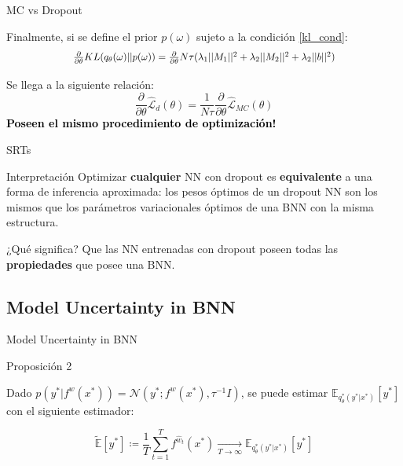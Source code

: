 \begin{frame}{MC vs Dropout}

Finalmente, si se define el prior $p(\omega)$ sujeto a la condición \ref{kl_cond}:
\begin{equation}\label{kl_cond}
    \scalebox{0.9}{$\frac{\partial}{\partial \theta} KL(q_{\theta}(\omega) || p(\omega)) = \frac{\partial}{\partial \theta} N\tau (\lambda_1||M_1||^2 + \lambda_2||M_2||^2 + \lambda_2||b||^2)$}
\end{equation}

Se llega a la siguiente relación:
\begin{equation}\label{mc-drop}
\frac{\partial}{\partial \theta}\hat{\mathcal{L}}_{d}(\theta) = \frac{1}{N\tau}\frac{\partial}{\partial \theta} \hat{\mathcal{L}}_{MC}(\theta)
\end{equation}
\textbf{\textcolor{black}{Poseen el mismo procedimiento de optimización!}}
\end{frame}
\begin{frame}{SRTs}
     \begin{block}{Interpretación}
        Optimizar \textbf{cualquier} NN con dropout es \textbf{equivalente} a una forma de inferencia aproximada: los pesos óptimos de un dropout NN son los mismos que los parámetros variacionales óptimos de una BNN con la misma estructura.
    \end{block}
    
    \begin{alertblock}{¿Qué significa?}
    Que las NN entrenadas con dropout poseen todas las \textbf{propiedades} que posee una BNN.
    \end{alertblock}
\end{frame}

\subsection{Model Uncertainty in BNN}

\begin{frame}{Model Uncertainty in BNN}

\begin{block}{Proposición 2}

Dado $p(y^*| f^{w}(x^*)) = \mathcal{N}(y^*; f^{w}(x^*), \tau^{-1}I)$, se puede estimar $\mathbb{E}_{q_{\theta}^* (y^*|x^*)}[y^*]$ con el siguiente estimador:

$$\tilde{\mathbb{E}}[y^*] \coloneqq \frac{1}{T}\sum_{t=1}^{T} f^{\hat{w}_t}(x^*) \xrightarrow[T \to \infty]{} \mathbb{E}_{q_{\theta}^* (y^*|x^*)}[y^*]$$
   
\end{block}

\end{frame}

